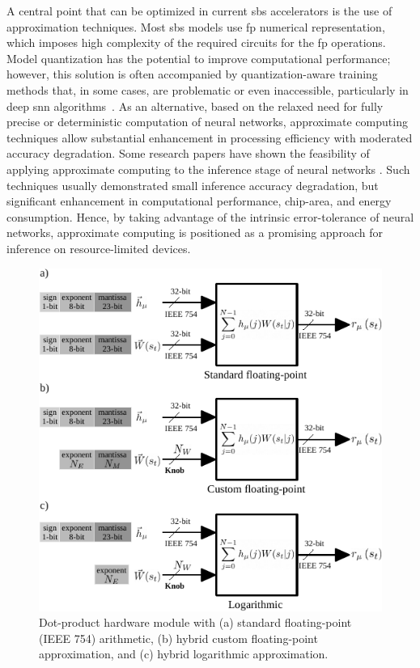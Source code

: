 A central point that can be optimized in current \gls{sbs} accelerators
is the use of approximation techniques.
Most \gls{sbs} models use \gls{fp}  numerical representation, which imposes high complexity of the required circuits for the \gls{fp} operations. Model quantization has the potential to improve computational performance; however, this solution is often accompanied by quantization-aware training methods that, in some cases, are problematic or even inaccessible, particularly in deep \gls{snn} algorithms~\cite{zhang2018survey}. 
As an alternative, based on the relaxed need for fully precise or deterministic computation of neural networks, approximate computing techniques allow substantial enhancement in processing efficiency with moderated accuracy degradation. Some research papers have shown the feasibility of applying approximate computing to the inference stage of neural networks \cite{lotrivc2012applicability, sarwar2016multiplier, mrazek2016design, du2014leveraging}. Such techniques usually demonstrated small inference accuracy degradation, but significant enhancement in computational performance, chip-area, and energy consumption. Hence, by taking advantage of the intrinsic error-tolerance of neural networks, approximate computing is positioned as a promising approach for inference on resource-limited devices.

\begin{figure}[b!]
	\centering
	\includegraphics[width=0.5\columnwidth]{./chapters/sbs_accelerator/figures/dot-product_unit.pdf}
	\caption{Dot-product hardware module with (a) standard floating-point (IEEE 754) arithmetic, (b) hybrid custom floating-point approximation, and (c) hybrid logarithmic approximation.}
	\label{fig:dot_product_unit}
\end{figure}


